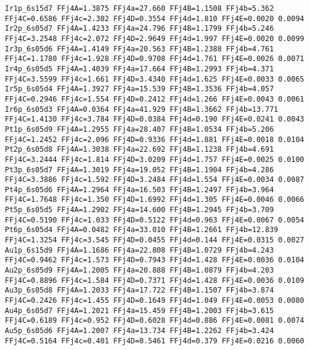 {\begin{verbatim}
Ir1p_6s15d7 FFj4A=1.3875 FFj4a=27.660 FFj4B=1.1508 FFj4b=5.362 FFj4C=0.6586 FFj4c=2.302 FFj4D=0.3554 FFj4d=1.810 FFj4E=0.0020 0.0094 
Ir2p_6s05d7 FFj4A=1.4233 FFj4a=24.796 FFj4B=1.1799 FFj4b=5.246 FFj4C=3.2548 FFj4c=2.072 FFj4D=2.9649 FFj4d=1.997 FFj4E=0.0020 0.0099 
Ir3p_6s05d6 FFj4A=1.4149 FFj4a=20.563 FFj4B=1.2388 FFj4b=4.761 FFj4C=1.1780 FFj4c=1.928 FFj4D=0.9708 FFj4d=1.761 FFj4E=0.0026 0.0071 
Ir4p_6s05d5 FFj4A=1.4039 FFj4a=17.664 FFj4B=1.2993 FFj4b=4.371 FFj4C=3.5599 FFj4c=1.661 FFj4D=3.4340 FFj4d=1.625 FFj4E=0.0033 0.0065 
Ir5p_6s05d4 FFj4A=1.3927 FFj4a=15.539 FFj4B=1.3536 FFj4b=4.057 FFj4C=0.2946 FFj4c=1.554 FFj4D=0.2412 FFj4d=1.266 FFj4E=0.0043 0.0061 
Ir6p_6s05d3 FFj4A=0.0364 FFj4a=41.929 FFj4B=1.3662 FFj4b=13.771 FFj4C=1.4130 FFj4c=3.784 FFj4D=0.0384 FFj4d=0.190 FFj4E=0.0241 0.0043 
Pt1p_6s05d9 FFj4A=1.2955 FFj4a=28.407 FFj4B=1.0534 FFj4b=5.206 FFj4C=1.2452 FFj4c=2.096 FFj4D=0.9336 FFj4d=1.881 FFj4E=0.0018 0.0104 
Pt2p_6s05d8 FFj4A=1.3038 FFj4a=22.692 FFj4B=1.1238 FFj4b=4.691 FFj4C=3.2444 FFj4c=1.814 FFj4D=3.0209 FFj4d=1.757 FFj4E=0.0025 0.0100 
Pt3p_6s05d7 FFj4A=1.3019 FFj4a=19.052 FFj4B=1.1904 FFj4b=4.286 FFj4C=3.3886 FFj4c=1.592 FFj4D=3.2484 FFj4d=1.554 FFj4E=0.0034 0.0087 
Pt4p_6s05d6 FFj4A=1.2964 FFj4a=16.503 FFj4B=1.2497 FFj4b=3.964 FFj4C=1.7648 FFj4c=1.350 FFj4D=1.6992 FFj4d=1.305 FFj4E=0.0046 0.0066 
Pt5p_6s05d5 FFj4A=1.2902 FFj4a=14.600 FFj4B=1.2945 FFj4b=3.709 FFj4C=0.5190 FFj4c=1.033 FFj4D=0.5122 FFj4d=0.963 FFj4E=0.0067 0.0054 
Pt6p_6s05d4 FFj4A=0.0482 FFj4a=33.010 FFj4B=1.2661 FFj4b=12.839 FFj4C=1.3254 FFj4c=3.545 FFj4D=0.0455 FFj4d=0.144 FFj4E=0.0315 0.0027 
Au1p_6s15d9 FFj4A=1.1686 FFj4a=22.808 FFj4B=1.0729 FFj4b=4.243 FFj4C=0.9462 FFj4c=1.573 FFj4D=0.7943 FFj4d=1.428 FFj4E=0.0036 0.0104 
Au2p_6s05d9 FFj4A=1.2005 FFj4a=20.888 FFj4B=1.0879 FFj4b=4.203 FFj4C=0.8896 FFj4c=1.584 FFj4D=0.7371 FFj4d=1.428 FFj4E=0.0036 0.0109 
Au3p_6s05d8 FFj4A=1.2033 FFj4a=17.722 FFj4B=1.1507 FFj4b=3.874 FFj4C=0.2426 FFj4c=1.455 FFj4D=0.1649 FFj4d=1.049 FFj4E=0.0053 0.0080 
Au4p_6s05d7 FFj4A=1.2021 FFj4a=15.459 FFj4B=1.2003 FFj4b=3.615 FFj4C=0.6189 FFj4c=0.952 FFj4D=0.6028 FFj4d=0.886 FFj4E=0.0081 0.0074 
Au5p_6s05d6 FFj4A=1.2007 FFj4a=13.734 FFj4B=1.2262 FFj4b=3.424 FFj4C=0.5164 FFj4c=0.401 FFj4D=0.5461 FFj4d=0.379 FFj4E=0.0216 0.0060 


\end{verbatim}
}
